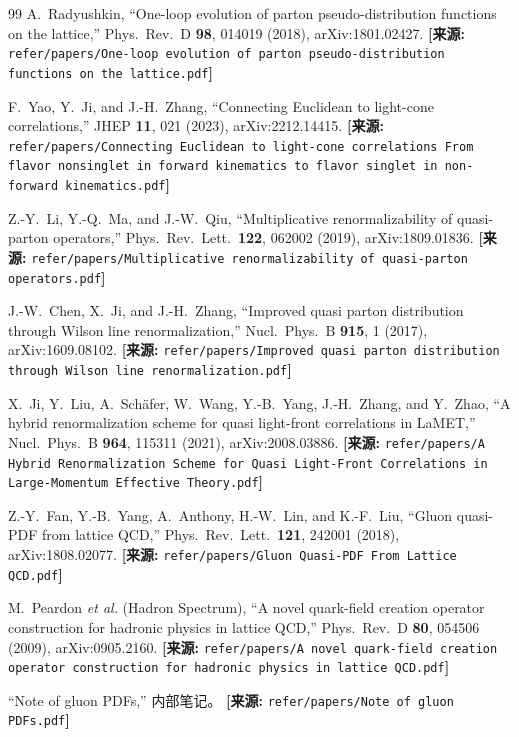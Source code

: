 \documentclass[12pt,a4paper]{ctexart}
\theoremstyle{definition}
\begin{document}
\begin{thebibliography}{99}
A.~Radyushkin,
``One-loop evolution of parton pseudo-distribution functions on the lattice,''
Phys.\ Rev.\ D \textbf{98}, 014019 (2018), arXiv:1801.02427.
\quad\textbf{[来源:} \texttt{refer/papers/One-loop evolution of parton pseudo-distribution functions on the lattice.pdf}\textbf{]}

F.~Yao, Y.~Ji, and J.-H.~Zhang,
``Connecting Euclidean to light-cone correlations,''
JHEP \textbf{11}, 021 (2023), arXiv:2212.14415.
\quad\textbf{[来源:} \texttt{refer/papers/Connecting Euclidean to light-cone correlations From flavor nonsinglet in forward kinematics to flavor singlet in non-forward kinematics.pdf}\textbf{]}

Z.-Y.~Li, Y.-Q.~Ma, and J.-W.~Qiu,
``Multiplicative renormalizability of quasi-parton operators,''
Phys.\ Rev.\ Lett.\ \textbf{122}, 062002 (2019), arXiv:1809.01836.
\quad\textbf{[来源:} \texttt{refer/papers/Multiplicative renormalizability of quasi-parton operators.pdf}\textbf{]}

J.-W.~Chen, X.~Ji, and J.-H.~Zhang,
``Improved quasi parton distribution through Wilson line renormalization,''
Nucl.\ Phys.\ B \textbf{915}, 1 (2017), arXiv:1609.08102.
\quad\textbf{[来源:} \texttt{refer/papers/Improved quasi parton distribution through Wilson line renormalization.pdf}\textbf{]}

X.~Ji, Y.~Liu, A.~Sch\"afer, W.~Wang, Y.-B.~Yang, J.-H.~Zhang, and Y.~Zhao,
``A hybrid renormalization scheme for quasi light-front correlations in LaMET,''
Nucl.\ Phys.\ B \textbf{964}, 115311 (2021), arXiv:2008.03886.
\quad\textbf{[来源:} \texttt{refer/papers/A Hybrid Renormalization Scheme for Quasi Light-Front Correlations in Large-Momentum Effective Theory.pdf}\textbf{]}

Z.-Y.~Fan, Y.-B.~Yang, A.~Anthony, H.-W.~Lin, and K.-F.~Liu,
``Gluon quasi-PDF from lattice QCD,''
Phys.\ Rev.\ Lett.\ \textbf{121}, 242001 (2018), arXiv:1808.02077.
\quad\textbf{[来源:} \texttt{refer/papers/Gluon Quasi-PDF From Lattice QCD.pdf}\textbf{]}

M.~Peardon \textit{et al.} (Hadron Spectrum),
``A novel quark-field creation operator construction for hadronic physics in lattice QCD,''
Phys.\ Rev.\ D \textbf{80}, 054506 (2009), arXiv:0905.2160.
\quad\textbf{[来源:} \texttt{refer/papers/A novel quark-field creation operator construction for hadronic physics in lattice QCD.pdf}\textbf{]}

``Note of gluon PDFs,'' 内部笔记。
\quad\textbf{[来源:} \texttt{refer/papers/Note of gluon PDFs.pdf}\textbf{]}

\end{thebibliography}
\end{document}
